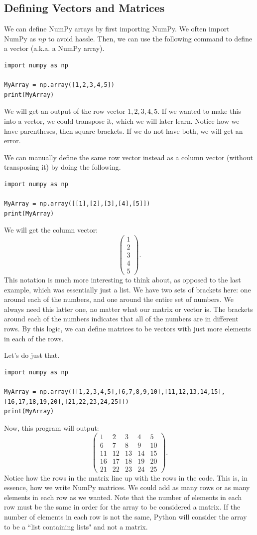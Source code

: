 \documentclass{article}
\begin{document}
\subsection{Defining Vectors and Matrices}
We can define NumPy arrays by first importing NumPy. We often import NumPy as $np$ to avoid hassle. Then, we can use the following command to define a vector (a.k.a. a NumPy array).
\begin{lstlisting}
import numpy as np

MyArray = np.array([1,2,3,4,5])
print(MyArray)
\end{lstlisting}
We will get an output of the row vector $1,2,3,4,5$. If we wanted to make this into a vector, we could transpose it, which we will later learn. Notice how we have parentheses, then square brackets. If we do not have both, we will get an error. 

We can manually define the same row vector instead as a column vector (without transposing it) by doing the following.
\begin{lstlisting}
import numpy as np

MyArray = np.array([[1],[2],[3],[4],[5]])
print(MyArray)
\end{lstlisting}
We will get the column vector:
\[\begin{pmatrix}
1\\
2\\
3\\
4\\
5
\end{pmatrix}.\]
This notation is much more interesting to think about, as opposed to the last example, which was essentially just a list. We have two sets of brackets here: one around each of the numbers, and one around the entire set of numbers. We always need this latter one, no matter what our matrix or vector is. The brackets around each of the numbers indicates that all of the numbers are in different rows. By this logic, we can define matrices to be vectors with just more elements in each of the rows. 

Let's do just that.
\begin{lstlisting}
import numpy as np

MyArray = np.array([[1,2,3,4,5],[6,7,8,9,10],[11,12,13,14,15],[16,17,18,19,20],[21,22,23,24,25]])
print(MyArray)
\end{lstlisting}
Now, this program will output:
\[\begin{pmatrix}
1 & 2 & 3 & 4 & 5\\
6 & 7 & 8 & 9 & 10\\
11 & 12 & 13 & 14 & 15\\
16 & 17 & 18 & 19 & 20\\
21 & 22 & 23 & 24 & 25
\end{pmatrix}.\]
Notice how the rows in the matrix line up with the rows in the code. This is, in essence, how we write NumPy matrices. We could add as many rows or as many elements in each row as we wanted. Note that the number of elements in each row must be the same in order for the array to be considered a matrix. If the number of elements in each row is not the same, Python will consider the array to be a ``list containing lists" and not a matrix. 
\end{document}
